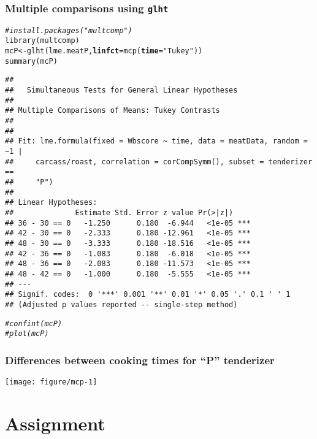 \documentclass[color=usenames,dvipsnames]{beamer}\usepackage[]{graphicx}\usepackage[]{color}
\makeatletter
\newcommand{\hlstr}[1]{\textcolor[rgb]{0.749,0.012,0.012}{#1}}%
\newcommand{\hlcom}[1]{\textcolor[rgb]{0.514,0.506,0.514}{\textit{#1}}}%
\newcommand{\hlstd}[1]{\textcolor[rgb]{0,0,0}{#1}}%
\newcommand{\hlkwb}[1]{\textcolor[rgb]{0,0.341,0.682}{#1}}%
\newcommand{\hlkwc}[1]{\textcolor[rgb]{0,0,0}{\textbf{#1}}}%
\newcommand{\hlkwd}[1]{\textcolor[rgb]{0.004,0.004,0.506}{#1}}%
\newenvironment{kframe}{%
 \def\at@end@of@kframe{}%
 \ifinner\ifhmode%
  \def\at@end@of@kframe{\end{minipage}}%
  \begin{minipage}{\columnwidth}%
 \fi\fi%
 \def\FrameCommand##1{\hskip\@totalleftmargin \hskip-\fboxsep
 \colorbox{shadecolor}{##1}\hskip-\fboxsep
     \hskip-\linewidth \hskip-\@totalleftmargin \hskip\columnwidth}%
 \MakeFramed {\advance\hsize-\width
   \@totalleftmargin\z@ \linewidth\hsize
   \@setminipage}}%
 {\par\unskip\endMakeFramed%
 \at@end@of@kframe}
\newenvironment{knitrout}{}{} %
\newcommand{\inr}[1]{\colorbox{inlinecolor}{\texttt{#1}}}
\makeatother
\begin{document}
\begin{frame}[fragile]
  \frametitle{Multiple comparisons using {\tt glht}}
\scriptsize %
\begin{knitrout}\tiny
{}\color{fgcolor}\begin{kframe}
\begin{alltt}
\hlcom{# install.packages("multcomp")}
\hlkwd{library}\hlstd{(multcomp)}
\hlstd{mcP} \hlkwb{<-} \hlkwd{glht}\hlstd{(lme.meatP,} \hlkwc{linfct}\hlstd{=}\hlkwd{mcp}\hlstd{(}\hlkwc{time}\hlstd{=}\hlstr{"Tukey"}\hlstd{))}
\hlkwd{summary}\hlstd{(mcP)}
\end{alltt}
\begin{verbatim}
## 
## 	 Simultaneous Tests for General Linear Hypotheses
## 
## Multiple Comparisons of Means: Tukey Contrasts
## 
## 
## Fit: lme.formula(fixed = Wbscore ~ time, data = meatData, random = ~1 | 
##     carcass/roast, correlation = corCompSymm(), subset = tenderizer == 
##     "P")
## 
## Linear Hypotheses:
##              Estimate Std. Error z value Pr(>|z|)    
## 36 - 30 == 0   -1.250      0.180  -6.944   <1e-05 ***
## 42 - 30 == 0   -2.333      0.180 -12.961   <1e-05 ***
## 48 - 30 == 0   -3.333      0.180 -18.516   <1e-05 ***
## 42 - 36 == 0   -1.083      0.180  -6.018   <1e-05 ***
## 48 - 36 == 0   -2.083      0.180 -11.573   <1e-05 ***
## 48 - 42 == 0   -1.000      0.180  -5.555   <1e-05 ***
## ---
## Signif. codes:  0 '***' 0.001 '**' 0.01 '*' 0.05 '.' 0.1 ' ' 1
## (Adjusted p values reported -- single-step method)
\end{verbatim}
\begin{alltt}
\hlcom{# confint(mcP)}
\hlcom{# plot(mcP)}
\end{alltt}
\end{kframe}
\end{knitrout}
\end{frame}



\begin{frame}[fragile]
  \frametitle{\small Differences between cooking times for ``P'' tenderizer}
  \centering \footnotesize %

\texttt{[image: figure/mcp-1]} \\
\end{frame}




\section{Assignment}
\end{document}
